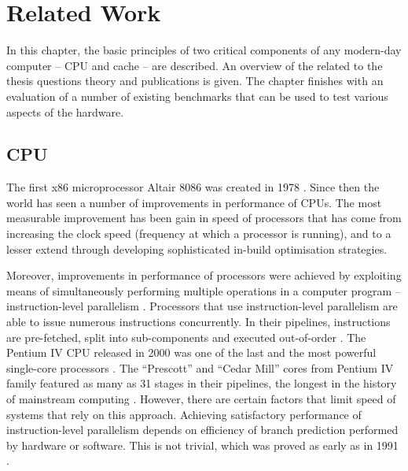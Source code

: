 
\chapter{Related Work} %



\ifpdf
    \graphicspath{{X/figures/PNG/}{X/figures/PDF/}{X/figures/}}
\else 
    \graphicspath{{X/figures/EPS/}{X/figures/}}
\fi


In this chapter, the basic principles of two critical components of any modern-day computer -- CPU and cache -- are described. An overview of the related to the thesis questions theory and publications is given. The chapter finishes with an evaluation of a number of existing benchmarks that can be used to test various aspects of the hardware.

\section{CPU}

The first x86 microprocessor Altair 8086 was created in 1978 \cite{gove2010multicore}. Since then the world has seen a number of improvements in performance of CPUs. The most measurable improvement has been gain in speed of processors that has come from increasing the clock speed (frequency at which a processor is running), and to a lesser extend through developing sophisticated in-build optimisation strategies.

Moreover, improvements in performance of processors were achieved by exploiting means of simultaneously performing multiple operations in a computer program -- instruction-level parallelism \cite{Hennessy2006}. Processors that use instruction-level parallelism are able to issue numerous instructions concurrently. In their pipelines, instructions are pre-fetched, split into sub-components and executed out-of-order \cite{schauer2008multicore}. The Pentium IV CPU released in 2000 was one of the last and the most powerful single-core processors \cite{Intel2000}. The “Prescott” and “Cedar Mill” cores from Pentium IV family featured as many as 31 stages in their pipelines, the longest in the history of mainstream computing \cite{Schmid2004}. However, there are certain factors that limit speed of systems that rely on this approach. Achieving satisfactory performance of instruction-level parallelism depends on efficiency of branch prediction performed by hardware or software. This is not trivial, which was proved as early as in 1991 \cite{Wall1991}. 

